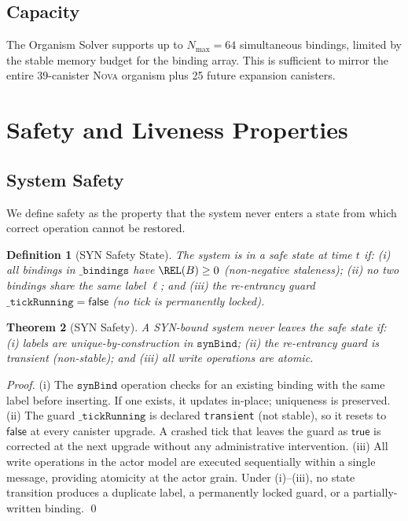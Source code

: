 \documentclass[12pt]{article}
\newtheorem{theorem}{Theorem}
\newtheorem{definition}[theorem]{Definition}
\newcommand{\synBind}{\texttt{synBind}}
\begin{document}
\subsection{Capacity}

The Organism Solver supports up to $N_{\max} = 64$ simultaneous bindings,
limited by the stable memory budget for the binding array.  This is sufficient
to mirror the entire 39-canister \textsc{Nova} organism plus 25 future
expansion canisters.

\section{Safety and Liveness Properties}
\label{sec:liveness}

\subsection{System Safety}

We define safety as the property that the system never enters a state from
which correct operation cannot be restored.

\begin{definition}[SYN Safety State]
  The system is in a \emph{safe state} at time $t$ if:
  (i) all bindings in $\texttt{\_bindings}$ have $\REL(B) \ge 0$ (non-negative
  staleness); (ii) no two bindings share the same label $\ell$; and (iii) the
  re-entrancy guard $\texttt{\_tickRunning} = \mathsf{false}$ (no tick is
  permanently locked).
\end{definition}

\begin{theorem}[SYN Safety]
  \label{thm:safety}
  A SYN-bound system never leaves the safe state if: (i) labels are
  unique-by-construction in $\synBind$; (ii) the re-entrancy guard is
  transient (non-stable); and (iii) all write operations are atomic.
\end{theorem}

\begin{proof}
  (i) The $\synBind$ operation checks for an existing binding with the same
  label before inserting.  If one exists, it updates in-place; uniqueness
  is preserved.
  (ii) The guard $\texttt{\_tickRunning}$ is declared \texttt{transient}
  (not stable), so it resets to $\mathsf{false}$ at every canister upgrade.
  A crashed tick that leaves the guard as $\mathsf{true}$ is corrected at
  the next upgrade without any administrative intervention.
  (iii) All write operations in the actor model are executed sequentially
  within a single message, providing atomicity at the actor grain.
  Under (i)--(iii), no state transition produces a duplicate label, a
  permanently locked guard, or a partially-written binding. \qed
\end{proof}
\end{document}
